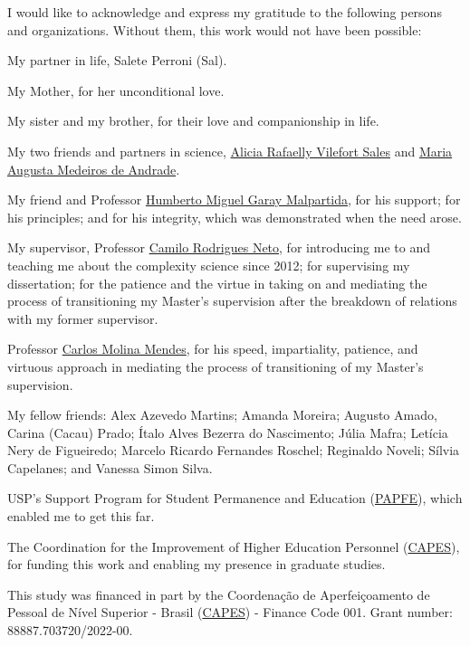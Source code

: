 \begin{agradecimentos}[\agradecimentosname]

I would like to acknowledge and express my gratitude to the following
persons and organizations. Without them, this work would not have been
possible:

\smallskip

My partner in life, Salete Perroni (Sal).

My Mother, for her unconditional love.

My sister and my brother, for their love and companionship in life.

My two friends and partners in science,
\href{https://orcid.org/0000-0003-0004-4487}{Alicia Rafaelly Vilefort
Sales} and \href{https://orcid.org/0000-0002-9283-9967}{Maria Augusta
Medeiros de Andrade}.

My friend and Professor
\href{https://orcid.org/0000-0002-1164-2055}{Humberto Miguel Garay
Malpartida}, for his support; for his principles; and for his integrity,
which was demonstrated when the need arose.

My supervisor, Professor
\href{https://orcid.org/0000-0001-6783-6695}{Camilo Rodrigues Neto}, for
introducing me to and teaching me about the complexity science since
2012; for supervising my dissertation; for the patience and the virtue
in taking on and mediating the process of transitioning my Master's
supervision after the breakdown of relations with my former supervisor.

Professor \href{https://orcid.org/0000-0003-2916-4415}{Carlos Molina
Mendes}, for his speed, impartiality, patience, and virtuous approach in
mediating the process of transitioning of my Master's supervision.

My fellow friends: Alex Azevedo Martins; Amanda Moreira; Augusto Amado,
Carina (Cacau) Prado; Ítalo Alves Bezerra do Nascimento; Júlia Mafra;
Letícia Nery de Figueiredo; Marcelo Ricardo Fernandes Roschel; Reginaldo
Noveli; Sílvia Capelanes; and Vanessa Simon Silva.

USP's Support Program for Student Permanence and Education
(\href{https://prip.usp.br/apoio-estudantil/}{PAPFE}), which enabled me
to get this far.

The Coordination for the Improvement of Higher Education Personnel
(\href{https://www.gov.br/capes/}{CAPES}), for funding this work and
enabling my presence in graduate studies.

\smallskip
\begingroup
\renewcommand{\baselinestretch}{1}

\noindent This study was financed in part by the Coordenação de
Aperfeiçoamento de Pessoal de Nível Superior - Brasil
(\href{https://www.gov.br/capes/}{CAPES}) - Finance Code 001. Grant
number: 88887.703720/2022-00.

\endgroup

\end{agradecimentos}

